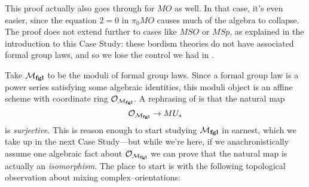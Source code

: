 \begin{remark}
This proof actually also goes through for $MO$ as well.  In that case, it's even easier, since the equation $2 = 0$ in $\pi_0 MO$ causes much of the algebra to collapse.  The proof does not extend further to cases like $MSO$ or $M\textit{Sp}$, as explained in the introduction to this Case Study: these bordism theories do not have associated formal group laws, and so we lose the control we had in .
\end{remark}

Take $\mathcal{M}_{\mathbf{fgl}}$ to be the moduli of formal group laws.  Since a formal group law is a power series satisfying some algebraic identities, this moduli object is an affine scheme with coordinate ring $\mathcal{O}_{\mathcal{M}_{\mathbf{fgl}}}$.  A rephrasing of  is that the natural map \[\mathcal{O}_{\mathcal{M}_{\mathbf{fgl}}} \to MU_*\] is \emph{surjective}.  This is reason enough to start studying $\mathcal{M}_{\mathbf{fgl}}$ in earnest, which we take up in the next Case Study---but while we're here, if we anachronistically assume one algebraic fact about $\mathcal{O}_{\mathcal{M}_{\mathbf{fgl}}}$ we can prove that the natural map is actually an \emph{isomorphism}.  The place to start is with the following topological observation about mixing complex--orientations:


